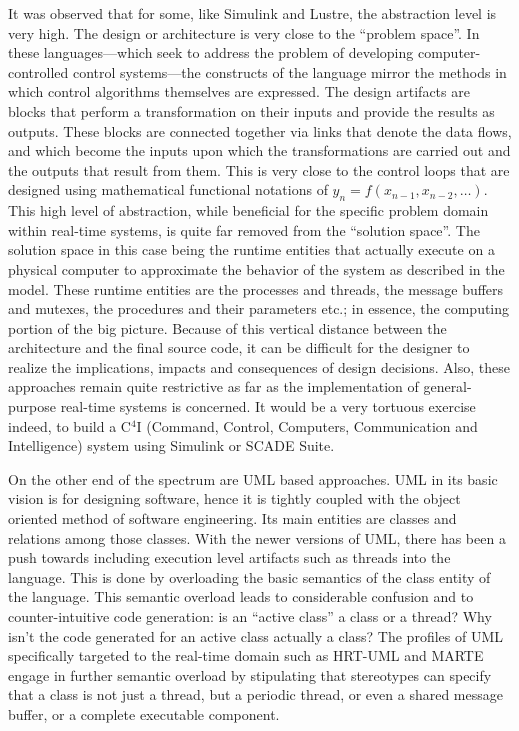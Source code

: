 It was observed that for some, like Simulink and Lustre, the
abstraction level is very high. The design or architecture is very
close to the ``problem space''. In these languages---which seek to
address the problem of developing computer-controlled control
systems---the constructs of the language mirror the methods in which
control algorithms themselves are expressed. The design artifacts are
blocks that perform a transformation on their inputs and provide the
results as outputs. These blocks are connected together via links that
denote the data flows, and which become the inputs upon which the
transformations are carried out and the outputs that result from
them. This is very close to the control loops that are designed using
mathematical functional notations of $y_n = f(x_{n-1}, x_{n-2},
\dots)$. This high level of abstraction, while beneficial for the
specific problem domain within real-time systems, is quite far removed
from the ``solution space''. The solution space in this case being the
runtime entities that actually execute on a physical computer to
approximate the behavior of the system as described in the
model. These runtime entities are the processes and threads, the
message buffers and mutexes, the procedures and their parameters etc.;
in essence, the computing portion of the big picture. Because of this
vertical distance between the architecture and the final source code,
it can be difficult for the designer to realize the implications,
impacts and consequences of design decisions. Also, these approaches
remain quite restrictive as far as the implementation of
general-purpose real-time systems is concerned. It would be a very
tortuous exercise indeed, to build a C$^4$I (Command, Control,
Computers, Communication and Intelligence) system using Simulink or
SCADE Suite.

On the other end of the spectrum are UML based approaches. UML in its
basic vision is for designing software, hence it is tightly coupled
with the object oriented method of software engineering. Its main
entities are classes and relations among those classes. With the newer
versions of UML, there has been a push towards including execution
level artifacts such as threads into the language. This is done by
overloading the basic semantics of the class entity of the
language. This semantic overload leads to considerable confusion and
to counter-intuitive code generation: is an ``active class'' a class
or a thread? Why isn't the code generated for an active class actually
a class? The profiles of UML specifically targeted to the real-time
domain such as HRT-UML and MARTE engage in further semantic overload
by stipulating that stereotypes can specify that a class is not just a
thread, but a periodic thread, or even a shared message buffer, or a
complete executable component.

